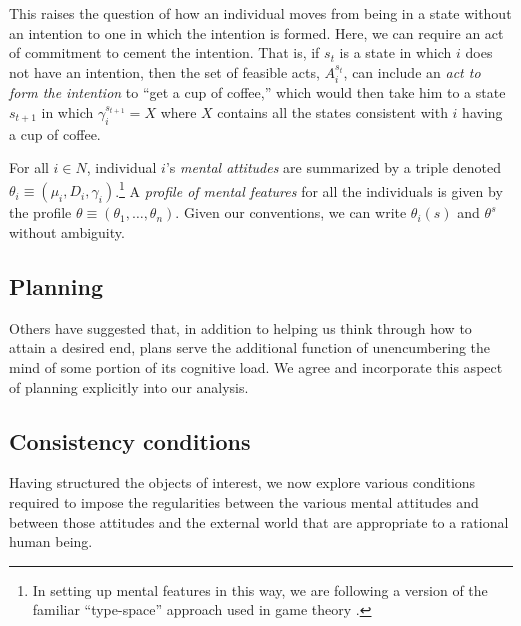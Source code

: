 \documentclass[
11pt,
titlepage,
reqno,
]{article}%
\theoremstyle{definition}
\begin{document}
	This raises the question of how an individual moves from being in a state without an intention to one in which the intention is formed. 
	Here, we can require an act of commitment to cement the intention. 
	That is, if $s_t$ is a state in which $i$ does not have an intention, then the set of feasible acts, $A^{s_t}_i$, can include an \textit{act to form the intention} to ``get a cup of coffee,'' which would then take him to a state $s_{t+1}$ in which $\gamma_i^{s_{t+1}}=X$ where $X$ contains all the states consistent with $i$ having a cup of coffee.
	
	For all $i\in N$, individual $i$'s \textit{mental attitudes} are summarized by a triple denoted $\theta_i\equiv(\mu_i,D_i,\gamma_i)$.\footnote
	{
		In setting up mental features in this way, we are following a version of the familiar ``type-space'' approach used in game theory \citep[See][]{Harsanyi1967, Mertens1985a}. 
	} 
	A \textit{profile of mental features} for all the individuals is given by the profile $\theta\equiv(\theta_1,\ldots,\theta_n)$. 
	Given our conventions, we can write $\theta_i(s)$ and $\theta^s$ without ambiguity.
	
	
	\subsection{Planning}
	Others have suggested that, in addition to helping us think through how to attain a desired end, plans serve the additional function of unencumbering the mind of some portion of its cognitive load. 
	We agree and incorporate this aspect of planning explicitly into our analysis.
	
	
	\subsection{Consistency conditions\label{sec:consistencies}}
	
	Having structured the objects of interest, we now explore various conditions required to impose the regularities between the various mental attitudes and between those attitudes and the external world that are appropriate to a rational human being. 
	
\end{document}
